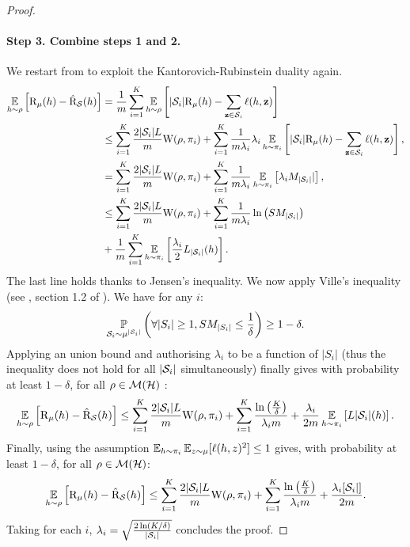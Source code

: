 \documentclass{article}
\begin{document}
\begin{proof}
\paragraph{Step 3. Combine steps 1 and 2.}
    We restart from  to exploit the Kantorovich-Rubinstein duality again.
    \begin{align*}
        \EE_{h\sim\Q}\Big[ \Risk_{\D}(h) - \Riskhat_{\S}(h) \Big] &=  \frac{1}{m}\sum_{i=1}^{K} \EE_{h\sim\Q}\LB |\S_i|\Risk_{\D}(h) - \sum_{\z\in\S_i}\loss(h, \z) \RB\nonumber\\
        &\le \sum_{i=1}^{K} \frac{2|\S_i|L}{m}\W(\Q, \P_i) + \sum_{i=1}^{K} \frac{1}{m\lambda_i}\lambda_i\EE_{h\sim\P_i} \LB |\S_i|\Risk_{\D}(h) - \sum_{\z\in\S_i} \loss(h, \z) \RB, \\
        & = \sum_{i=1}^{K} \frac{2|\S_i|L}{m}\W(\Q, \P_i) + \sum_{i=1}^{K} \frac{1}{m\lambda_i}\EE_{h\sim\P_i} \LB \lambda_i M_{|\S_i|}| \RB, \\
        &\le   \sum_{i=1}^{K} \frac{2|\S_i|L}{m}\W(\Q, \P_i) + \sum_{i=1}^{K} \frac{1}{m\lambda_i} \ln\left( SM_{|\S_i|}  \right) \\
        & + \frac{1}{m}\sum_{i=1}^K \EE_{h\sim\P_i}\LB\frac{\lambda_i}{2} L_{|\S_i|}(h) \RB.
    \end{align*}
    The last line holds thanks to Jensen's inequality.
    We now apply Ville's inequality (see \eg, section 1.2 of \cite{haddouche2023pac}). We have for any $i$: 
    \begin{align*}
    \PP_{\S_i \sim \D^{|\S_i|}}\left( \forall |S_i|\geq 1, SM_{|S_i|} \leq \frac{1}{\delta}  \right) \geq 1-\delta.
    \end{align*}
    Applying an union bound and authorising $\lambda_i$ to be a function of $|S_i|$ (thus the inequality does not hold for all $|\S_i|$ simultaneously) finally gives with probability at least $1-\delta$, for all $\Q\in \Mcal(\H)$ :
    \begin{align*}
         \EE_{h\sim\Q}\Big[ \Risk_{\D}(h) - \Riskhat_{\S}(h) \Big] \leq    \sum_{i=1}^{K} \frac{2|\S_i|L}{m}\W(\Q, \P_i) + \sum_{i=1}^{K}   \frac{\ln\left( \frac{K}{\delta}  \right)}{\lambda_i m} + \frac{\lambda_i}{2m}\EE_{h\sim\P_i}\LB L{|\S_i|}(h) \RB.
    \end{align*}
    Finally, using the assumption $\EE_{h\sim \P_i}\EE_{z\sim \D}[\loss(h,z)^2] \leq 1$ gives, with probability at least $1-\delta$, for all $\Q\in \Mcal(\H)$:
    \begin{align*}
         \EE_{h\sim\Q}\Big[ \Risk_{\D}(h) - \Riskhat_{\S}(h) \Big] \leq    \sum_{i=1}^{K} \frac{2|\S_i|L}{m}\W(\Q, \P_i) + \sum_{i=1}^{K}   \frac{\ln\left( \frac{K}{\delta}  \right)}{\lambda_i m} + \frac{\lambda_i[\S_i|]}{2m}.
    \end{align*}
    Taking for each $i$, $\lambda_i= \sqrt{\frac{2\ln(K/\delta)}{|\S_i|}}$ concludes the proof.
\end{proof}
    
\end{document}
